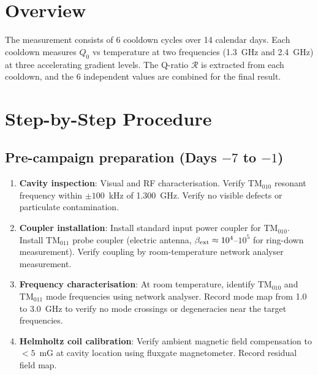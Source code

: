 \documentclass[11pt]{article}
\theoremstyle{definition}
\theoremstyle{remark}
\begin{document}
\section{Overview}

The measurement consists of 6 cooldown cycles over 14 calendar days.
Each cooldown measures $Q_0$ vs temperature at two frequencies
(1.3~GHz and 2.4~GHz) at three accelerating gradient levels. The
Q-ratio $\mathcal{R}$ is extracted from each cooldown, and the
6 independent values are combined for the final result.


\section{Step-by-Step Procedure}
\label{sec:steps}

\begin{tcolorbox}[colback=white, colframe=black,
  title=\textbf{PHASE 0a: MEASUREMENT PROTOCOL (14 days, 6 cooldowns)},
  breakable]

\subsection*{Pre-campaign preparation (Days $-7$ to $-1$)}

\begin{enumerate}[label=\textbf{P\arabic*.}, leftmargin=2cm]
\item \textbf{Cavity inspection}: Visual and RF characterisation.
  Verify TM$_{010}$ resonant frequency within $\pm 100$~kHz of
  1.300~GHz. Verify no visible defects or particulate contamination.

\item \textbf{Coupler installation}: Install standard input power
  coupler for TM$_{010}$. Install TM$_{011}$ probe coupler
  (electric antenna, $\beta_{\rm ext} \approx 10^{4}$--$10^{5}$
  for ring-down measurement). Verify coupling by room-temperature
  network analyser measurement.

\item \textbf{Frequency characterisation}: At room temperature,
  identify TM$_{010}$ and TM$_{011}$ mode frequencies using network
  analyser. Record mode map from 1.0 to 3.0~GHz to verify no mode
  crossings or degeneracies near the target frequencies.

\item \textbf{Helmholtz coil calibration}: Verify ambient magnetic
  field compensation to $< 5$~mG at cavity location using fluxgate
  magnetometer. Record residual field map.


\end{enumerate}
\end{tcolorbox}
\end{document}
